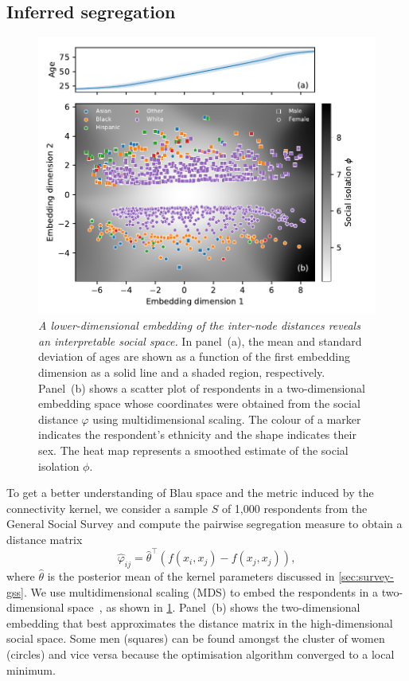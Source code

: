 \documentclass{scrartcl}
\newcommand{\transpose}[1]{#1^\intercal}
\newcommand{\titlecaption}[2]{\caption[#1]{\emph{#1} #2}}
\begin{document}
\subsection{Inferred segregation}

\begin{figure}
    \includegraphics{segregation-embedding}
    \titlecaption{A lower-dimensional embedding of the inter-node distances reveals an interpretable social space.}{In panel~(a), the mean and standard deviation of ages are shown as a function of the first embedding dimension as a solid line and a shaded region, respectively. Panel~(b) shows a scatter plot of respondents in a two-dimensional embedding space whose coordinates were obtained from the social distance $\varphi$ using multidimensional scaling. The colour of a marker indicates the respondent's ethnicity and the shape indicates their sex. The heat map represents a smoothed estimate of the social isolation $\phi$.\label{fig:segregation-embedding}}
\end{figure}

To get a better understanding of Blau space and the metric induced by the connectivity kernel, we consider a sample $S$ of 1,000 respondents from the General Social Survey and compute the pairwise segregation measure to obtain a distance matrix
\[
    \hat\varphi_{ij} = \transpose{\hat\theta}\left(f(x_i, x_j) - f(x_j, x_j)\right),
\]
where $\hat\theta$ is the posterior mean of the kernel parameters discussed in \cref{sec:survey-gss}. We use multidimensional scaling (MDS) to embed the respondents in a two-dimensional space~\cite{Borg1996}, as shown in \cref{fig:segregation-embedding}. Panel~(b) shows the two-dimensional embedding that best approximates the distance matrix in the high-dimensional social space. Some men (squares) can be found amongst the cluster of women (circles) and vice versa because the optimisation algorithm converged to a local minimum.
\end{document}

